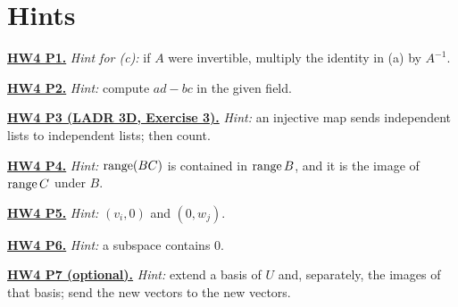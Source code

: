 \documentclass[10pt]{scrartcl}
\begin{document}
\section*{Hints}

\par\medskip\noindent\textbf{\hyperlink{prob-HW4-P1}{HW4 P1.}} \emph{Hint for (c):} if $A$ were invertible, multiply the identity in (a) by $A^{-1}$.

\par\medskip\noindent\textbf{\hyperlink{prob-HW4-P2}{HW4 P2.}} \emph{Hint:} compute $ad-bc$ in the given field.

\par\medskip\noindent\textbf{\hyperlink{prob-HW4-P3}{HW4 P3 (LADR 3D, Exercise 3).}} \emph{Hint:} an injective map sends independent lists to independent lists; then count.

\par\medskip\noindent\textbf{\hyperlink{prob-HW4-P4}{HW4 P4.}} \emph{Hint:} $\operatorname{range}(BC)$ is contained in $\operatorname{range} B$, and it is the image of $\operatorname{range} C$ under $B$.

\par\medskip\noindent\textbf{\hyperlink{prob-HW4-P5}{HW4 P5.}} \emph{Hint:} $(v_i,0)$ and $(0,w_j)$.

\par\medskip\noindent\textbf{\hyperlink{prob-HW4-P6}{HW4 P6.}} \emph{Hint:} a subspace contains $0$.

\par\medskip\noindent\textbf{\hyperlink{prob-HW4-P7}{HW4 P7 (optional).}} \emph{Hint:} extend a basis of $U$ and, separately, the images of that basis; send the new vectors to the new vectors.
\end{document}

